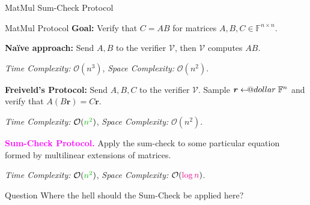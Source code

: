 \documentclass{zkdl-presentation-template}
\makeatletter
\newcommand\leftarrowS{\leftarrow\joinrel\smalldollar}
\newcommand{\smalldollar}{\mathrel{\mathpalette\small@dollar\relax}}
\newcommand{\small@dollar}[2]{%
  \vcenter{\hbox{%
    $#1\textnormal{\fontsize{0.7\dimexpr\f@size pt}{0}\selectfont\$}$%
  }}%
}
\makeatother
\begin{document}
    \begin{frame}{MatMul Sum-Check Protocol}
        \begin{block}{MatMul Protocol}
            \textbf{Goal:} Verify that $C=AB$ for matrices $A,B,C \in
            \mathbb{F}^{n \times n}$.
        \end{block}

        \textcolor{blue!70!black}{\textbf{Naïve approach:}} Send $A,B$ to 
        the verifier $\mathcal{V}$, then $\mathcal{V}$ computes $AB$. 

        \textcolor{gray!80!black}{\textit{Time Complexity:} $\mathcal{O}(n^3)$, \textit{Space Complexity:}
        $\mathcal{O}(n^2)$.}

        \textcolor{green!70!black}{\textbf{Freiveld's Protocol:}} Send $A,B,C$
        to the verifier $\mathcal{V}$. Sample $\boldsymbol{r} \leftarrowS
        \mathbb{F}^n$ and verify that $A(B\boldsymbol{r}) =
        C\boldsymbol{r}$.

        \textcolor{gray!80!black}{\textit{Time Complexity:} $\mathcal{O}(\textcolor{green!70!black}{n^2})$, \textit{Space Complexity:}
        $\mathcal{O}(n^2)$.}

        \textcolor{magenta}{\textbf{Sum-Check Protocol.}} Apply the sum-check to 
        some particular equation formed by multilinear extensions of matrices.

        \textcolor{gray!80!black}{\textit{Time Complexity:} $\mathcal{O}(\textcolor{green!70!black}{n^2})$, \textit{Space Complexity:}
        $\mathcal{O}(\textcolor{magenta}{\log n})$.}

        \begin{alertblock}{Question}
            Where the hell should the Sum-Check be applied here?
        \end{alertblock}
    \end{frame}
\end{document}
